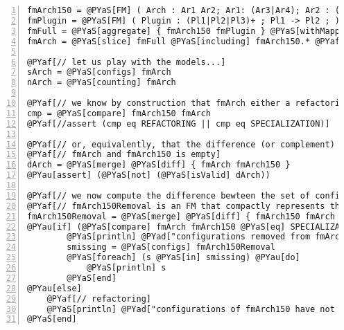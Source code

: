 \documentclass{article}
\begin{document}
\section*{}

\begin{Verbatim}[commandchars=@\[\],numbers=left,firstnumber=1,stepnumber=1]
fmArch150 = @PYaS[FM] ( Arch : Ar1 Ar2; Ar1: (Ar3|Ar4); Ar2 : (Ar5|Ar6); )
fmPlugin = @PYaS[FM] ( Plugin : (Pl1|Pl2|Pl3)+ ; Pl1 -> Pl2 ; )
fmFull = @PYaS[aggregate] { fmArch150 fmPlugin } @PYaS[withMapping] @PYaS[constraints] (Ar3 -> Pl1 ; Pl2 -> Ar5; )
fmArch = @PYaS[slice] fmFull @PYaS[including] fmArch150.* @PYaf[// // enforced architectural FM]

@PYaf[// let us play with the models...]
sArch = @PYaS[configs] fmArch
nArch = @PYaS[counting] fmArch

@PYaf[// we know by construction that fmArch either a refactoring or a specialization of fmArch150]
cmp = @PYaS[compare] fmArch150 fmArch
@PYaf[//assert (cmp eq REFACTORING || cmp eq SPECIALIZATION)]

@PYaf[// or, equivalently, that the difference (or complement) bewteen the set of configurations of ]
@PYaf[// fmArch and fmArch150 is empty]
dArch = @PYaS[merge] @PYaS[diff] { fmArch fmArch150 }
@PYau[assert] (@PYaS[not] (@PYaS[isValid] dArch))

@PYaf[// we now compute the difference bewteen the set of configurations of fmArch150 and fmArch]
@PYaf[// fmArch150Removal is an FM that compactly represents this difference]
fmArch150Removal = @PYaS[merge] @PYaS[diff] { fmArch150 fmArch }
@PYau[if] (@PYaS[compare] fmArch fmArch150 @PYaS[eq] SPECIALIZATION) @PYaS[then]
   	    @PYaS[println] @PYad["configurations removed from fmArch150="] 
   	    smissing = @PYaS[configs] fmArch150Removal
   	    @PYaS[foreach] (s @PYaS[in] smissing) @PYau[do]
   	    	@PYaS[println] s
   	    @PYaS[end]
@PYau[else]
	@PYaf[// refactoring]
    @PYaS[println] @PYad["configurations of fmArch150 have not been modified"]
@PYaS[end]
\end{Verbatim}
\end{document}
